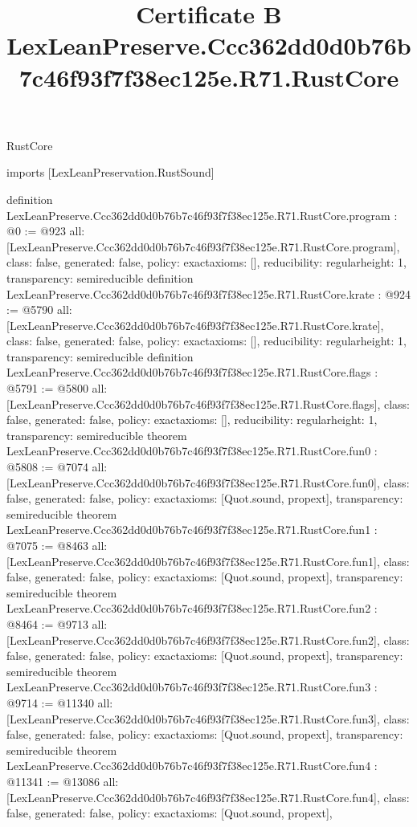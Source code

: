 \begin{lexlean}{RustCore}
\title{Certificate B LexLeanPreserve.Ccc362dd0d0b76b7c46f93f7f38ec125e.R71.RustCore}
\begin{coremodule}
imports [LexLeanPreservation.RustSound]

definition LexLeanPreserve.Ccc362dd0d0b76b7c46f93f7f38ec125e.R71.RustCore.program : @0 := @923 {
  all: [LexLeanPreserve.Ccc362dd0d0b76b7c46f93f7f38ec125e.R71.RustCore.program],
  class: false,
  generated: false,
  policy: exact{axioms: []},
  reducibility: regular{height: 1},
  transparency: semireducible
}
definition LexLeanPreserve.Ccc362dd0d0b76b7c46f93f7f38ec125e.R71.RustCore.krate : @924 := @5790 {
  all: [LexLeanPreserve.Ccc362dd0d0b76b7c46f93f7f38ec125e.R71.RustCore.krate],
  class: false,
  generated: false,
  policy: exact{axioms: []},
  reducibility: regular{height: 1},
  transparency: semireducible
}
definition LexLeanPreserve.Ccc362dd0d0b76b7c46f93f7f38ec125e.R71.RustCore.flags : @5791 := @5800 {
  all: [LexLeanPreserve.Ccc362dd0d0b76b7c46f93f7f38ec125e.R71.RustCore.flags],
  class: false,
  generated: false,
  policy: exact{axioms: []},
  reducibility: regular{height: 1},
  transparency: semireducible
}
theorem LexLeanPreserve.Ccc362dd0d0b76b7c46f93f7f38ec125e.R71.RustCore.fun0 : @5808 := @7074 {
  all: [LexLeanPreserve.Ccc362dd0d0b76b7c46f93f7f38ec125e.R71.RustCore.fun0],
  class: false,
  generated: false,
  policy: exact{axioms: [Quot.sound, propext]},
  transparency: semireducible
}
theorem LexLeanPreserve.Ccc362dd0d0b76b7c46f93f7f38ec125e.R71.RustCore.fun1 : @7075 := @8463 {
  all: [LexLeanPreserve.Ccc362dd0d0b76b7c46f93f7f38ec125e.R71.RustCore.fun1],
  class: false,
  generated: false,
  policy: exact{axioms: [Quot.sound, propext]},
  transparency: semireducible
}
theorem LexLeanPreserve.Ccc362dd0d0b76b7c46f93f7f38ec125e.R71.RustCore.fun2 : @8464 := @9713 {
  all: [LexLeanPreserve.Ccc362dd0d0b76b7c46f93f7f38ec125e.R71.RustCore.fun2],
  class: false,
  generated: false,
  policy: exact{axioms: [Quot.sound, propext]},
  transparency: semireducible
}
theorem LexLeanPreserve.Ccc362dd0d0b76b7c46f93f7f38ec125e.R71.RustCore.fun3 : @9714 := @11340 {
  all: [LexLeanPreserve.Ccc362dd0d0b76b7c46f93f7f38ec125e.R71.RustCore.fun3],
  class: false,
  generated: false,
  policy: exact{axioms: [Quot.sound, propext]},
  transparency: semireducible
}
theorem LexLeanPreserve.Ccc362dd0d0b76b7c46f93f7f38ec125e.R71.RustCore.fun4 : @11341 := @13086 {
  all: [LexLeanPreserve.Ccc362dd0d0b76b7c46f93f7f38ec125e.R71.RustCore.fun4],
  class: false,
  generated: false,
  policy: exact{axioms: [Quot.sound, propext]},
}
\end{coremodule}
\end{lexlean}
